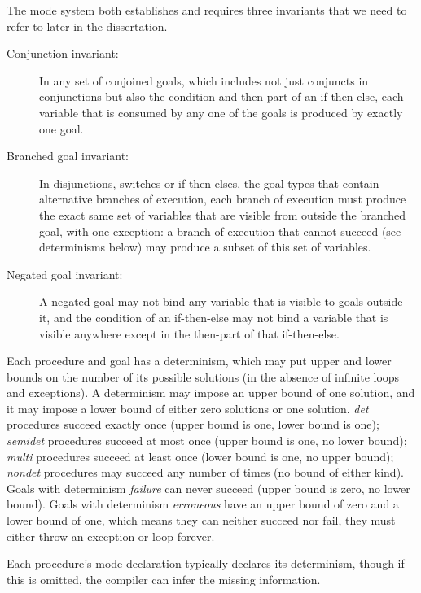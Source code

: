 The mode system both establishes and requires three invariants
that we need to refer to later in the dissertation.

\begin{description}

  \item[Conjunction invariant:]
  In any set of conjoined goals,
  which includes not just conjuncts in conjunctions
  but also the condition and then-part of an if-then-else,
  each variable that is consumed by any one of the goals
  is produced by exactly one goal.
  
  \item[Branched goal invariant:]
  In disjunctions, switches or if-then-elses,
  the goal types that contain alternative branches of execution,
  each branch of execution must produce
  the exact same set of variables
  that are visible from outside the branched goal,
  with one exception:
  a branch of execution that cannot succeed (see determinisms below)
  may produce a subset of this set of variables.
  
  \item[Negated goal invariant:]
  A negated goal may not bind
  any variable that is visible to goals outside it,
  and the condition of an if-then-else may not bind a variable
  that is visible anywhere except in
  the then-part of that if-then-else.

\end{description}

\noindent
Each procedure and goal has a determinism,
which may put upper and lower bounds on the number of its possible solutions
(in the absence of infinite loops and exceptions).
A determinism may impose an upper bound of one solution,
and it may impose a lower bound of either zero solutions or one solution.
\emph{det} procedures succeed exactly once
(upper bound is one, lower bound is one);
\emph{semidet} procedures succeed at most once
(upper bound is one, no lower bound);
\emph{multi} procedures succeed at least once
(lower bound is one, no upper bound);
\emph{nondet} procedures may succeed any number of times
(no bound of either kind).
Goals with determinism \emph{failure} can never succeed
(upper bound is zero, no lower bound).
Goals with determinism \emph{erroneous}
have an upper bound of zero and a lower bound of one,
which means they can neither succeed nor fail,
they must either throw an exception or loop forever.

Each procedure's mode declaration
typically declares its determinism,
though if this is omitted, the compiler can infer the missing information.

